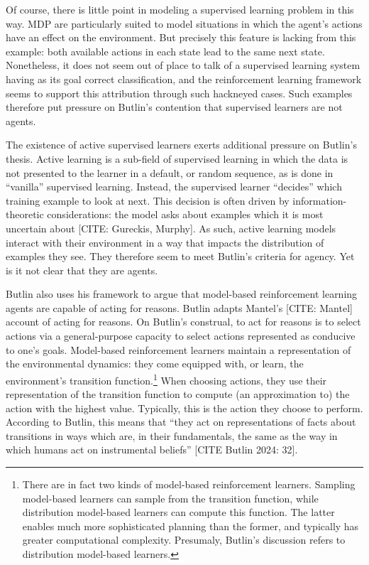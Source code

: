 Of course, there is little point in modeling a supervised learning problem in this way.
MDP are particularly suited to model situations in which the agent's actions have an effect on the environment.
But precisely this feature is lacking from this example: both available actions in each state lead to the same next state.
Nonetheless, it does not seem out of place to talk of a supervised learning system having as its goal correct classification, and the reinforcement learning framework seems to support this attribution through such hackneyed cases.
Such examples therefore put pressure on Butlin's contention that supervised learners are not agents.

The existence of active supervised learners exerts additional pressure on Butlin's thesis.
Active learning is a sub-field of supervised learning in which the data is not presented to the learner in a default, or random sequence, as is done in ``vanilla'' supervised learning.
Instead, the supervised learner ``decides'' which training example to look at next.
This decision is often driven by information-theoretic considerations: the model asks about examples which it is most uncertain about [CITE: Gureckis, Murphy].
As such, active learning models interact with their environment in a way that impacts the distribution of examples they see.
They therefore seem to meet Butlin's criteria for agency.
Yet is it not clear that they are agents.

Butlin also uses his framework to argue that model-based reinforcement learning agents are capable of acting for reasons.
Butlin adapts Mantel's [CITE: Mantel] account of acting for reasons.
On Butlin's construal, to act for reasons is to select actions via a general-purpose capacity to select actions represented as conducive to one's goals.
Model-based reinforcement learners maintain a representation of the environmental dynamics: they come equipped with, or learn, the environment's transition function.\footnote{There are in fact two kinds of model-based reinforcement learners. Sampling model-based learners can sample from the transition function, while distribution model-based learners can compute this function. The latter enables much more sophisticated planning than the former, and typically has greater computational complexity. Presumaly, Butlin's discussion refers to distribution model-based learners.}
When choosing actions, they use their representation of the transition function to compute (an approximation to) the action with the highest value.
Typically, this is the action they choose to perform.
According to Butlin, this means that ``they act on representations of facts about transitions in ways which are, in their fundamentals, the same as the way in which humans act on instrumental beliefs'' [CITE Butlin 2024: 32].

